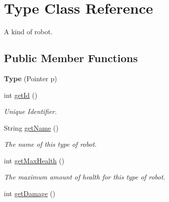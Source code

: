 \hypertarget{classType}{
\section{Type Class Reference}
\label{classType}
}


A kind of robot.  


\subsection*{Public Member Functions}
\begin{DoxyCompactItemize}
\item 
\hypertarget{classType_a80eb5dae88597d301fcd2093b29cd6e2}{
{\bfseries Type} (Pointer p)}
\label{classType_a80eb5dae88597d301fcd2093b29cd6e2}

\item 
\hypertarget{classType_aba890fe7677f58f7135ec0cfe1b7c926}{
int \hyperlink{classType_aba890fe7677f58f7135ec0cfe1b7c926}{getId} ()}
\label{classType_aba890fe7677f58f7135ec0cfe1b7c926}

\begin{DoxyCompactList}\small\item\em Unique Identifier. \item\end{DoxyCompactList}\item 
\hypertarget{classType_ae9e9175c018b99cf24788f099e4dbe58}{
String \hyperlink{classType_ae9e9175c018b99cf24788f099e4dbe58}{getName} ()}
\label{classType_ae9e9175c018b99cf24788f099e4dbe58}

\begin{DoxyCompactList}\small\item\em The name of this type of robot. \item\end{DoxyCompactList}\item 
\hypertarget{classType_a63d5ef17263cd941cdb736977e6a0852}{
int \hyperlink{classType_a63d5ef17263cd941cdb736977e6a0852}{getMaxHealth} ()}
\label{classType_a63d5ef17263cd941cdb736977e6a0852}

\begin{DoxyCompactList}\small\item\em The maximum amount of health for this type of robot. \item\end{DoxyCompactList}\item 
\hypertarget{classType_a846406cfce299636d81d08c1240a8474}{
int \hyperlink{classType_a846406cfce299636d81d08c1240a8474}{getDamage} ()}
\label{classType_a846406cfce299636d81d08c1240a8474}


\end{DoxyCompactItemize}
